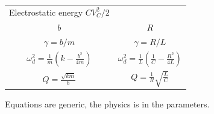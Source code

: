 \documentclass[11pt]{article}
\begin{document}
\begin{longtable}[]{@{}cc@{}}
\begin{minipage}[t]{0.47\columnwidth}
Electrostatic energy \(CV_C^2/2\)\strut
\end{minipage}\tabularnewline
\begin{minipage}[t]{0.47\columnwidth}\centering
\(b\)\strut
\end{minipage} & \begin{minipage}[t]{0.47\columnwidth}\centering
\(R\)\strut
\end{minipage}\tabularnewline
\begin{minipage}[t]{0.47\columnwidth}\centering
\(\gamma=b/m\)\strut
\end{minipage} & \begin{minipage}[t]{0.47\columnwidth}\centering
\(\gamma=R/L\)\strut
\end{minipage}\tabularnewline
\begin{minipage}[t]{0.47\columnwidth}\centering
\(\omega_d^2=\frac1m\left(k-\frac{b^2}{4m}\right)\)\strut
\end{minipage} & \begin{minipage}[t]{0.47\columnwidth}\centering
\(\omega_d^2=\frac1L\left(\frac1C-\frac{R^2}{4L}\right)\)\strut
\end{minipage}\tabularnewline
\begin{minipage}[t]{0.47\columnwidth}\centering
\(Q=\frac{\sqrt{km}}b\)\strut
\end{minipage} & \begin{minipage}[t]{0.47\columnwidth}\centering
\(Q=\frac1R\sqrt{\frac{L}{C}}\)\strut
\end{minipage}\tabularnewline
\bottomrule
\end{longtable}

    Equations are generic, the physics is in the parameters.


    
    
    
    
\end{document}
